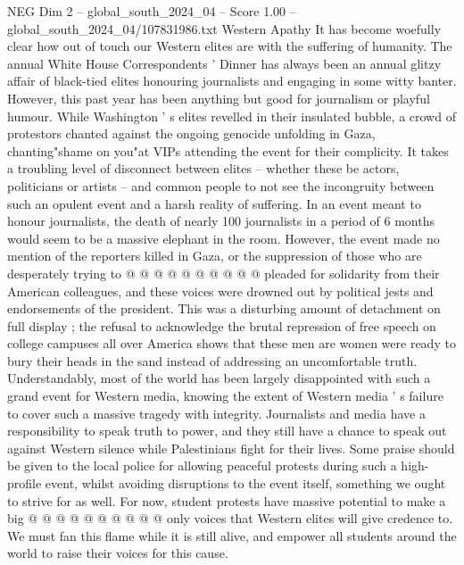 \begin{textsample}{NEG Dim 2 – global\_south\_2024\_04 – Score 1.00 – global\_south\_2024\_04/107831986.txt}  \label{ex:f2_neg_289}
Western Apathy It has become woefully clear how out of touch our Western elites are with the suffering of humanity.
The annual White House Correspondents ' Dinner has always been an annual glitzy affair of black-tied elites honouring journalists and engaging in some witty banter.
However, this past year has been anything but good for journalism or playful humour.
While Washington ' s elites revelled in their insulated bubble, a crowd of protestors chanted against the ongoing genocide unfolding in Gaza, chanting"shame on you"at VIPs attending the event for their complicity.
It takes a troubling level of disconnect between elites -- whether these be actors, politicians or artists -- and common people to not see the incongruity between such an opulent event and a harsh reality of suffering.
In an event meant to honour journalists, the death of nearly 100 journalists in a period of 6 months would seem to be a massive elephant in the room.
However, the event made no mention of the reporters killed in Gaza, or the suppression of those who are desperately trying to @ @ @ @ @ @ @ @ @ @ pleaded for solidarity from their American colleagues, and these voices were drowned out by political jests and endorsements of the president.
This was a disturbing amount of detachment on full display ; the refusal to acknowledge the brutal repression of free speech on college campuses all over America shows that these men are women were ready to bury their heads in the sand instead of addressing an uncomfortable truth.
Understandably, most of the world has been largely disappointed with such a grand event for Western media, knowing the extent of Western media ' s failure to cover such a massive tragedy with integrity.
Journalists and media have a responsibility to speak truth to power, and they still have a chance to speak out against Western silence while Palestinians fight for their lives.
Some praise should be given to the local police for allowing peaceful protests during such a high-profile event, whilst avoiding disruptions to the event itself, something we ought to strive for as well.
For now, student protests have massive potential to make a big @ @ @ @ @ @ @ @ @ @ only voices that Western elites will give credence to.
We must fan this flame while it is still alive, and empower all students around the world to raise their voices for this cause.

\end{textsample}

